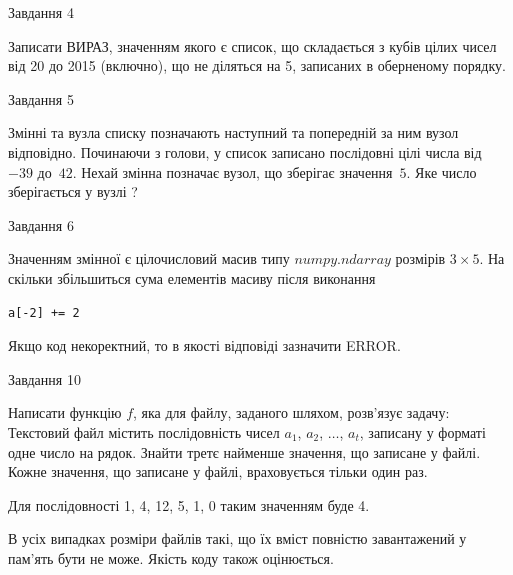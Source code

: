 \documentclass[12pt, ukrainian]{article}
\begin{document}
{               
{\begin{center}Завдання {4}\end{center}}
\vspace{-6mm}

Записати ВИРАЗ, значенням якого є список, що складається з кубів цілих чисел від 20 до 2015 (включно), що не діляться на 5, записаних в обернено\-му порядку.\par

\vspace{10mm}
               
{\begin{center}Завдання {5}\end{center}}
\vspace{-6mm}
Змінні  та  вузла списку позначають наступний та попередній за ним вузол відповідно. Починаючи з голови, у список записано послідовні цілі числа від~$-39$ до~$42$. Нехай змінна  позначає вузол, що зберігає значення~$5$.
Яке число зберігається у вузлі  ?\par

               
{\begin{center}Завдання {6}\end{center}}
\vspace{-6mm}
Значенням змінної  є цілочисловий масив типу $numpy.ndarray$ розмірів $3{\times}5$. На скільки збільшиться сума елементів масиву  після виконання
\begin{verbatim}
a[-2] += 2
\end{verbatim}


Якщо код некоректний, то в якості відповіді зазначити ERROR.\par

               
{\begin{center}Завдання {10}\end{center}}
\vspace{-6mm}

Написати функцію $f$, яка для файлу, заданого шляхом, розв’язує задачу:\\ Текстовий файл містить послідовність чисел $a_1$, $a_2$, $\ldots$, $a_t$, записану у форматі одне число на рядок. Знайти третє найменше значення, що записане у файлі. Кожне значення, що записане у файлі, враховується тільки один раз. \par
Для послідовності 1, 4, 12, 5, 1, 0 таким значенням буде 4.

В усіх випадках розміри файлів такі, що їх вміст повністю завантажений у пам'ять бути не може. Якість коду також оцінюється.



}
\end{document}
